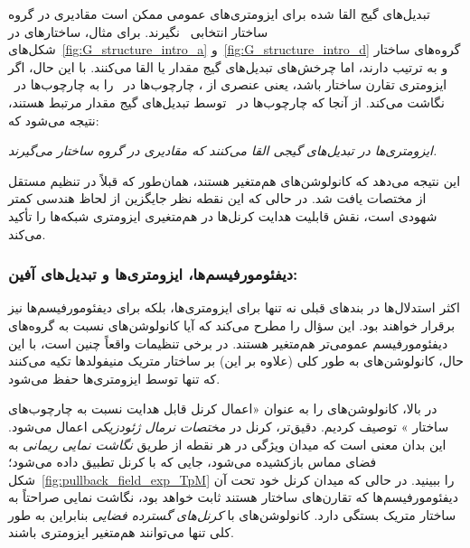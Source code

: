 تبدیل‌های گیج القا شده برای ایزومتری‌های عمومی ممکن است مقادیری در گروه ساختار انتخابی~ نگیرند.
برای مثال، ساختارهای  در شکل‌های~\ref{fig:G_structure_intro_a} و~\ref{fig:G_structure_intro_d} گروه‌های ساختار  و  به ترتیب دارند، اما چرخش‌های  تبدیل‌های گیج مقدار  یا  القا می‌کنند.
با این حال، اگر ایزومتری تقارن ساختار  باشد، یعنی عنصری از ، چارچوب‌ها در~\lr{$\GM$} را به چارچوب‌ها در~\lr{$\GM$} نگاشت می‌کند.
از آنجا که چارچوب‌ها در~\lr{$\GM$} توسط تبدیل‌های گیج مقدار  مرتبط هستند، نتیجه می‌شود که:
\begin{center}\it
	ایزومتری‌ها در  تبدیل‌های گیجی القا می‌کنند که مقادیری در گروه ساختار  می‌گیرند.
\end{center}
این نتیجه می‌دهد که کانولوشن‌های \lr{$\GM$} هم‌متغیر  هستند، همان‌طور که قبلاً در تنظیم مستقل از مختصات یافت شد.
در حالی که این نقطه نظر جایگزین از لحاظ هندسی کمتر شهودی است، نقش قابلیت هدایت  کرنل‌ها در هم‌متغیری ایزومتری شبکه‌ها را تأکید می‌کند.




\subsubsection{دیفئومورفیسم‌ها، ایزومتری‌ها و تبدیل‌های آفین:}
\label{sec:visual_intro_diffeo_equiv}

اکثر استدلال‌ها در بندهای قبلی نه تنها برای ایزومتری‌ها، بلکه برای دیفئومورفیسم‌ها نیز برقرار خواهند بود.
این سؤال را مطرح می‌کند که آیا کانولوشن‌های \lr{$\GM$} نسبت به گروه‌های دیفئومورفیسم عمومی‌تر هم‌متغیر هستند.
در برخی تنظیمات واقعاً چنین است، با این حال، کانولوشن‌های \lr{$\GM$} به طور کلی (علاوه بر این) بر ساختار متریک منیفولدها تکیه می‌کنند که تنها توسط ایزومتری‌ها حفظ می‌شود.


در بالا، کانولوشن‌های \lr{$\GM$} را به عنوان «اعمال کرنل قابل هدایت  نسبت به چارچوب‌های ساختار » توصیف کردیم.
دقیق‌تر، کرنل در \emph{مختصات نرمال ژئودزیکی} اعمال می‌شود.
این بدان معنی است که میدان ویژگی در هر نقطه  از طریق \emph{نگاشت نمایی ریمانی}  به فضای مماس \lr{$\TpM$} بازکشیده می‌شود، جایی که با کرنل تطبیق داده می‌شود؛ شکل~\ref{fig:pullback_field_exp_TpM} را ببینید.
در حالی که میدان کرنل خود تحت آن دیفئومورفیسم‌ها  که تقارن‌های ساختار  هستند ثابت خواهد بود، نگاشت نمایی صراحتاً به ساختار متریک بستگی دارد.
کانولوشن‌های \lr{$\GM$} با \emph{کرنل‌های گسترده فضایی} بنابراین به طور کلی تنها می‌توانند هم‌متغیر ایزومتری باشند.



